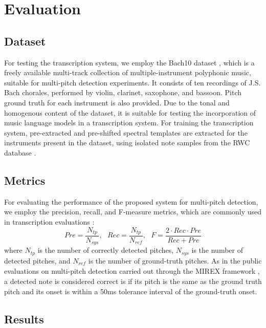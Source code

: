 \section{Evaluation} \label{sec:evaluation}

\subsection{Dataset}

For testing the transcription system, we employ the Bach10 dataset \cite{Duan2010}, which is a freely available multi-track collection of multiple-instrument polyphonic music, suitable for multi-pitch detection experiments. It consists of ten recordings of J.S. Bach chorales, performed by violin, clarinet, saxophone, and bassoon. Pitch ground truth for each instrument is also provided. Due to the tonal and homogenous content of the dataset, it is suitable for testing the incorporation of music language models in a transcription system. For training the transcription system, pre-extracted and pre-shifted spectral templates are extracted for the instruments present in the dataset, using isolated note samples from the RWC database \cite{Goto2003}. 

\subsection{Metrics}

For evaluating the performance of the proposed system for multi-pitch detection, we employ the precision, recall, and F-measure metrics, which are commonly used in transcription evaluations \cite{MIREX}:
\begin{equation}
 \mathit{Pre} = \frac{N_{\mathit{tp}}}{N_{\mathit{sys}}},\ \
\ \mathit{Rec} = \frac{N_{\mathit{tp}}}{N_{\mathit{ref}}},\
\ \ \mathit{F} = \frac{2\cdot\mathit{Rec}\cdot\mathit{Pre}}{\mathit{Rec}+\mathit{Pre}}
\label{eq:PRF}
\end{equation}
where $N_{\mathit{tp}}$ is the number of correctly detected pitches, $N_{\mathit{sys}}$ is the number of detected pitches, and $N_{\mathit{ref}}$ is the number of ground-truth pitches. As in the public evaluations on multi-pitch detection carried out through the MIREX framework \cite{MIREX}, a detected note is considered correct is if its pitch is the same as the ground truth pitch and its onset is within a 50ms tolerance interval of the ground-truth onset.

\subsection{Results}


